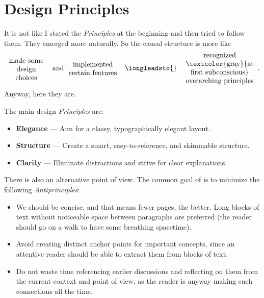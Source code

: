 \chapter{Design Principles} \label{ch:Design}

It is not like I stated the \emph{Principles} at the beginning and then tried to follow them.
They emerged more naturally.
So the causal structure is more like
\[
    \raisebox{-0.15ex}{\parbox[c]{6em}{\centering made some design choices}}
    \mspace{12mu} \text{and} \mspace{10mu}
    \parbox[c]{7em}{\centering implemented certain features}
    \quad\longleadsto{}\quad
    \parbox[c]{10em}{\centering recognized \\\textcolor{gray}{at first subconscious} overarching principles}~.
\]
Anyway, here they are.
\begin{definition} \label{def:Design Principles}
    The main design \emph{Principles} are:
    \begin{itemize}
        \item \textbf{Elegance} --- Aim for a classy, typographically elegant layout.
        \item \textbf{Structure} --- Create a smart, easy-to-reference, and skimmable structure.
        \item \textbf{Clarity} --- Eliminate distractions and strive for clear explanations. \qedhere
    \end{itemize}
\end{definition}
\begin{remark}
    There is also an alternative point of view.
    The common goal of  is to minimize the following \emph{Antiprinciples}:
    \begin{itemize}
        \item We should be concise, and that means fewer pages, the better.
              Long blocks of text without noticeable space between paragraphs are preferred (the reader should go on a walk to have some breathing spacetime).
        \item Avoid creating distinct anchor points for important concepts, since an attentive reader should be able to extract them from blocks of text.
        \item Do not waste time referencing earlier discussions and reflecting on them from the current context and point of view, as the reader is anyway making such connections all the time. \qedhere
    \end{itemize}
\end{remark}

